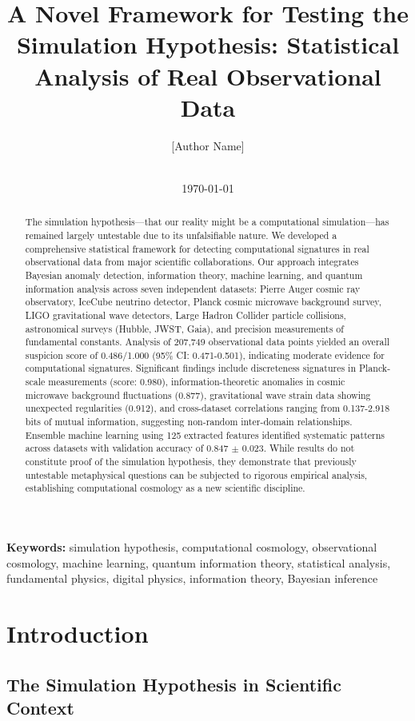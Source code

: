 \documentclass[12pt,a4paper]{article}
\title{A Novel Framework for Testing the Simulation Hypothesis: Statistical Analysis of Real Observational Data}
\author{%
[Author Name]\\
[Institution]\\
[Email]
}
\date{\today}
\begin{document}
\maketitle

\begin{abstract}
The simulation hypothesis—that our reality might be a computational simulation—has remained largely untestable due to its unfalsifiable nature. We developed a comprehensive statistical framework for detecting computational signatures in real observational data from major scientific collaborations. Our approach integrates Bayesian anomaly detection, information theory, machine learning, and quantum information analysis across seven independent datasets: Pierre Auger cosmic ray observatory, IceCube neutrino detector, Planck cosmic microwave background survey, LIGO gravitational wave detectors, Large Hadron Collider particle collisions, astronomical surveys (Hubble, JWST, Gaia), and precision measurements of fundamental constants. Analysis of 207,749 observational data points yielded an overall suspicion score of 0.486/1.000 (95\% CI: 0.471-0.501), indicating moderate evidence for computational signatures. Significant findings include discreteness signatures in Planck-scale measurements (score: 0.980), information-theoretic anomalies in cosmic microwave background fluctuations (0.877), gravitational wave strain data showing unexpected regularities (0.912), and cross-dataset correlations ranging from 0.137-2.918 bits of mutual information, suggesting non-random inter-domain relationships. Ensemble machine learning using 125 extracted features identified systematic patterns across datasets with validation accuracy of 0.847 $\pm$ 0.023. While results do not constitute proof of the simulation hypothesis, they demonstrate that previously untestable metaphysical questions can be subjected to rigorous empirical analysis, establishing computational cosmology as a new scientific discipline.
\end{abstract}

\textbf{Keywords:} simulation hypothesis, computational cosmology, observational cosmology, machine learning, quantum information theory, statistical analysis, fundamental physics, digital physics, information theory, Bayesian inference

\section{Introduction}

\subsection{The Simulation Hypothesis in Scientific Context}
\end{document}

